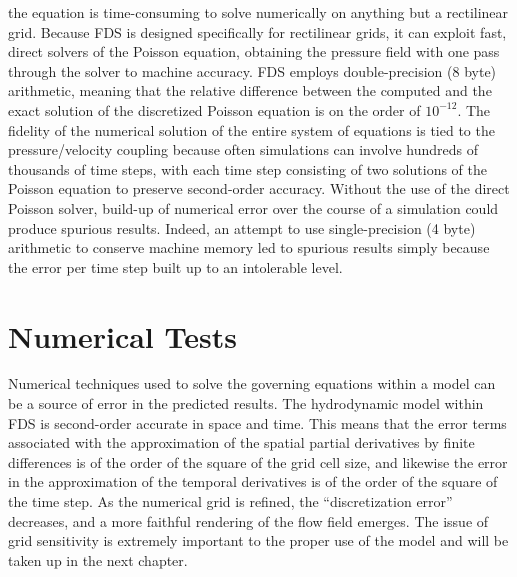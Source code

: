 \documentclass[11pt]{book}
\begin{document}
\begin{itemize}
the equation is time-consuming to solve numerically on anything but a rectilinear grid. Because FDS is designed specifically for rectilinear grids,
it can exploit fast, direct solvers of the Poisson equation, obtaining the pressure field with one pass through the solver to machine accuracy. FDS
employs double-precision (8 byte) arithmetic, meaning that the relative difference between the computed and the exact solution of the discretized
Poisson equation is on the order of $10^{-12}$. The fidelity of the numerical solution of the entire system of equations is tied to the
pressure/velocity coupling because often simulations can involve hundreds of thousands of time steps, with each time step consisting of two solutions
of the Poisson equation to preserve second-order accuracy. Without the use of the direct Poisson solver, build-up of numerical error over the course
of a simulation could produce spurious results. Indeed, an attempt to use single-precision (4 byte) arithmetic to conserve machine memory led to
spurious results simply because the error per time step built up to an intolerable level.
\end{itemize}



\section{Numerical Tests}

\label{Numerical Tests}


Numerical techniques used to solve the governing equations within a model can be a source of error in the predicted results.  The hydrodynamic model
within FDS is second-order accurate in space and time.  This means that the error terms associated with the approximation of the spatial partial
derivatives by finite differences is of the order of the square of the grid cell size, and likewise the error in the approximation of the temporal
derivatives is of the order of the square of the time step. As the numerical grid is refined, the ``discretization error'' decreases, and a more
faithful rendering of the flow field emerges.  The issue of grid sensitivity is extremely important to the proper use of the model and will be taken
up in the next chapter.
\end{document}
